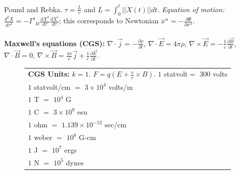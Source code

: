 Pound and Rebka. $\tau = {\frac L c}$ and $L = \int_0^t ||\dot{X}(t)|| dt$.
\emph{Equation of motion:} ${\frac {d^2 X} {{d \tau}^2}} = - {{\Gamma}^i}_{kl}
{\frac {d X^k} {d \tau}} {\frac {d X^l} {d \tau}}$; this corresponds to Newtonian
$\ddot{x}^{\alpha} = - {\frac {\partial \Phi} {\partial x^{\alpha}}}$.  
\\
\\
{\bf Maxwell's equations (CGS):}
$\nabla \cdot {\vec j} = - {\frac {\partial \rho} {\partial t}}$,
$\nabla \cdot {\vec E} =  4 \pi {\rho}$, 
$\nabla \times {\vec E} = - {\frac 1 c} {\frac {\partial {\vec B}}{\partial t}}$,
$\nabla \cdot {\vec B} = 0$,
$\nabla \times {\vec B} = {\frac {4 \pi} c} {\vec j} +
{\frac 1 c} {\frac {\partial {\vec E}} {\partial t}}$.
\begin{figure} [h]
\begin{center}
\begin{tabular} {|l|}
\hline
{\bf CGS Units:} $k=1$.  $F= q(E + {\frac v c} \times B)$.  
$1$ statvolt$=$ $300$ volts\\
$1$ statvolt/cm $=$ $3 \times 10^4$ volts/m\\
$1$ T $=$ $10^4$ G\\
$1$ C $=$ $3 \times 10^9$ esu\\
$1$ ohm $=$ $1.139 \times 10^{-12}$ sec/cm\\
$1$ weber $=$ $10^{8}$ G-cm\\
$1$ J $=$ $10^{7}$ ergs\\
$1$ N $=$ $10^{5}$ dynes\\
\hline
\end{tabular}
\end{center}
\end{figure}

